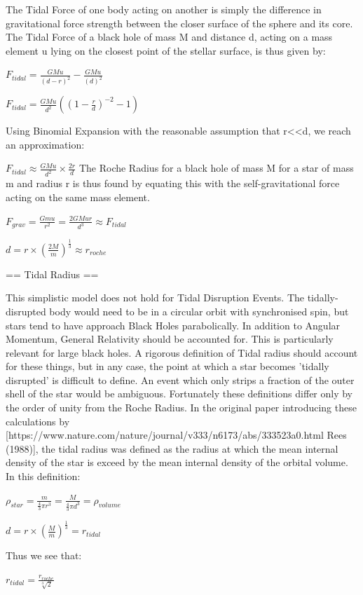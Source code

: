 \documentclass[]{article}
\begin{document}
The Tidal Force of one body acting on another is simply the difference in gravitational force strength between the closer surface of the sphere and its core. The Tidal Force of a black hole of mass M and distance d, acting on a mass element u lying on the closest point of the stellar surface, is thus given by:

$F_{tidal} = \frac{GMu}{(d-r)^{2}} - \frac{GMu}{(d)^{2}}$

$F_{tidal} = \frac{GMu}{d^{2}}((1-\frac{r}{d})^{-2} - 1 )$

Using Binomial Expansion with the reasonable assumption that r<<d, we reach an approximation:

$F_{tidal} \approx \frac{GMu}{d^{2}}\times \frac{2r}{d}$
The Roche Radius for a black hole of mass M for a star of mass m and radius r is thus found by equating this with the self-gravitational force acting on the same mass element. 

$F_{grav} = \frac{Gmu}{r^{2}} = \frac{2GMur}{d^{3}} \approx F_{tidal}$

$ d = r \times (\frac{2M}{m})^{\frac{1}{3}} \approx r_{roche}$

== Tidal Radius ==

This simplistic model does not hold for Tidal Disruption Events. The tidally-disrupted body would need to be in a circular orbit with synchronised spin, but stars tend to have approach Black Holes parabolically. In addition to Angular Momentum, General Relativity should be accounted for. This is particularly relevant for large black holes. A rigorous definition of Tidal radius should account for these things, but in any case, the point at which a star becomes 'tidally disrupted' is difficult to define. An event which only strips a fraction of the outer shell of the star would be ambiguous. Fortunately these definitions differ only by the order of unity from the Roche Radius. In the original paper introducing these calculations by [https://www.nature.com/nature/journal/v333/n6173/abs/333523a0.html Rees (1988)], the tidal radius was defined as the radius at which the mean internal density of the star is exceed by the mean internal density of the orbital volume. In this definition:

$\rho_{star} = \frac{m}{\frac{4}{3} \pi r ^{3}}  = \frac{M}{\frac{4}{3} \pi d ^{3}}= \rho_{volume}$

$ d = r \times (\frac{M}{m})^{\frac{1}{3}} = r_{tidal} $

Thus we see that:

$ r_{tidal} = \frac{r_{roche}}{\sqrt[3]{2}} $
\end{document}
